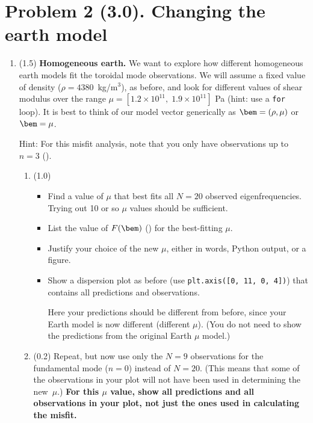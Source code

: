 \documentclass[11pt,titlepage,fleqn]{article}
\begin{document}

\section*{Problem 2 (3.0). Changing the earth model}

\begin{enumerate}
\item (1.5) {\bf Homogeneous earth.} We want to explore how different homogeneous earth models fit the toroidal mode observations. We will assume a fixed value of density ($\rho = 4380$~kg/m$^3$), as before, and look for different values of shear modulus over the range $\mu = [1.2\times 10^{11},\; 1.9 \times 10^{11}]$ Pa (hint: use a {\tt for} loop). It is best to think of our model vector generically as $\bem = (\rho, \mu)$ or $\bem = \mu$.

Hint: For this misfit analysis, note that you only have observations up to $n = 3$ ().

\begin{enumerate}
\item (1.0)
\begin{itemize}
\item Find a value of $\mu$ that best fits all $N=20$ observed eigenfrequencies. Trying out 10 or so $\mu$ values should be sufficient.
\item List the value of $F(\bem)$ () for the best-fitting $\mu$.
\item Justify your choice of the new $\mu$, either in words, Python output, or a figure.
\item Show a dispersion plot as before (use \verb+plt.axis([0, 11, 0, 4])+) that contains all predictions and observations.

Here your predictions should be different from before, since your Earth model is now different (\ie different $\mu$). (You do not need to show the predictions from the original Earth $\mu$ model.)
\end{itemize}

\item (0.2) Repeat, but now use only the $N = 9$ observations for the fundamental mode ($n=0$) instead of $N=20$. (This means that some of the observations in your plot will not have been used in determining the new~$\mu$.)
{\bf For this $\mu$ value, show all predictions and all observations in your plot, not just the ones used in calculating the misfit.}


\end{enumerate}
\end{enumerate}
\end{document}
